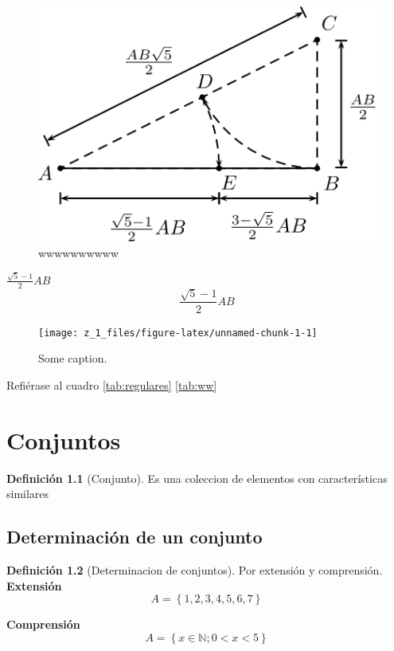 \documentclass[
  16pt,
]{krantz}
\theoremstyle{definition}
\newtheorem{definition}{Definición}[chapter]
\theoremstyle{definition}
\theoremstyle{definition}
\theoremstyle{definition}
\theoremstyle{remark}
\begin{document}
\begin{figure}

{\centering \includegraphics{aureo} 

}

\caption{wwwwwwwwww}\label{fig:ww1}
\end{figure}

\(\frac{\sqrt{5}-1}{2}AB\)
\[\frac{\sqrt{5}-1}{2}AB\]

\begin{figure}
\texttt{[image: z\_1\_files/figure-latex/unnamed-chunk-1-1]} \caption{Some caption.}\label{fig:unnamed-chunk-1}
\end{figure}

Refiérase al cuadro \ref{tab:regulares} \ref{tab:ww}

\hypertarget{conjuntos}{%
\chapter{Conjuntos}\label{conjuntos}}

\begin{definition}[Conjunto]
\protect\hypertarget{def:conjunto}{}\label{def:conjunto}Es una coleccion de elementos con características similares
\end{definition}

\hypertarget{determinaciuxf3n-de-un-conjunto}{%
\section{Determinación de un conjunto}\label{determinaciuxf3n-de-un-conjunto}}

\begin{definition}[Determinacion de conjuntos]
\protect\hypertarget{def:conjunto2}{}\label{def:conjunto2}Por extensión y comprensión.
\textbf{Extensión}
\[A=\left\{ 1,2,3,4,5,6,7 \right\} \]

\textbf{Comprensión}
\[A=\left\{ x \in \mathbb{N};0<x<5 \right\}  \]
\end{definition}
\end{document}
